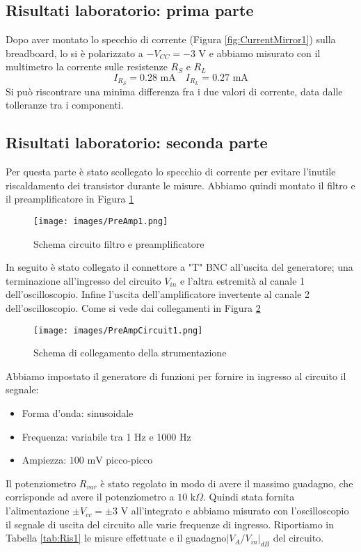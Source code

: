 \subsection{Risultati laboratorio: prima parte}
Dopo aver montato lo specchio di corrente (Figura \ref{fig:CurrentMirror1}) sulla breadboard, lo si è polarizzato a $-V_{CC}=-3\text{ V}$ e abbiamo misurato con il multimetro la corrente sulle resistenze $R_S$ e $R_L$
\begin{equation*}
    I_{R_S}=0.28\text{ mA}\quad I_{R_L}=0.27\text{ mA}
\end{equation*}
Si può riscontrare una minima differenza fra i due valori di corrente, data dalle tolleranze tra i componenti.
\clearpage
\subsection{Risultati laboratorio: seconda parte}
Per questa parte è stato scollegato lo specchio di corrente per evitare l'inutile riscaldamento dei transistor durante le misure. Abbiamo quindi montato il filtro e il preamplificatore in Figura \ref{fig:PreAmp1}
\begin{figure}[H]
    \centering
    \texttt{[image: images/PreAmp1.png]}
    \caption{Schema circuito filtro e preamplificatore}
    \label{fig:PreAmp1}
\end{figure}
In seguito è stato collegato il connettore a "T" BNC all'uscita del generatore; una terminazione all'ingresso del circuito  $V_{in}$ e l'altra estremità al canale 1 dell'oscilloscopio. Infine l'uscita dell'amplificatore invertente al canale 2 dell'oscilloscopio. Come si vede dai collegamenti in Figura \ref{fig:PreAmpCircuit1}
\begin{figure}[H]
    \centering
    \texttt{[image: images/PreAmpCircuit1.png]}
    \caption{Schema di collegamento della strumentazione}
    \label{fig:PreAmpCircuit1}
\end{figure}
\noindent Abbiamo impostato il generatore di funzioni per fornire in ingresso al circuito il segnale:
\begin{itemize}
    \item Forma d'onda: sinusoidale
    \item Frequenza: variabile tra 1 Hz e 1000 Hz
    \item Ampiezza: $100\text{ mV}$ picco-picco
\end{itemize}
Il potenziometro $R_{var}$ è stato regolato in modo di avere il massimo guadagno, che corrisponde ad avere il potenziometro a $10\text{ k}\Omega$. Quindi stata fornita l'alimentazione $\pm V_{cc}=\pm3\text{ V}$ all'integrato e abbiamo misurato con l'oscilloscopio il segnale di uscita del circuito alle varie frequenze di ingresso. Riportiamo in Tabella \ref{tab:Ris1} le misure effettuate e il guadagno$\left|V_A/V_{in}\right|_{dB}$ del circuito.
